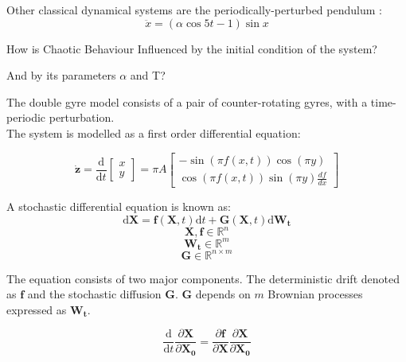 \documentclass{juliacon}
\newcommand{\drv}{\textrm{d}}
\begin{document}
Other classical dynamical systems are the periodically-perturbed pendulum :
\begin{equation}
\ddot{x}=(\alpha \cos5t -1 )\sin x
\end{equation}

How is Chaotic Behaviour Influenced by the initial condition of the system? 

And by its parameters $\alpha$ and T?

The double gyre model consists of a pair of counter-rotating gyres, with a time-periodic perturbation. \\ The system is modelled as a first order differential equation:

\begin{equation}
\dot{\mathbf{z}} =\frac{\drv}{\drv t}\begin{bmatrix}
    x \\
    y  \end{bmatrix}=\pi A\begin{bmatrix}
    -\sin(\pi f(x,t))\cos(\pi y) \\
    \cos(\pi f(x,t))\sin(\pi y)\frac{df}{dx}  \end{bmatrix} 
\end{equation}

A stochastic differential equation \cite{oksendal} is known as:
\begin{equation}
    \drv \mathbf{X}=\mathbf{f}(\mathbf{X},t) \drv t + \mathbf{G}(\mathbf{X},t) \drv \mathbf{W_t}
\end{equation}
\begin{equation*}
   \mathbf{X},\mathbf{f} \in \mathbb{R}^{n} 
\end{equation*}
\begin{equation*}
    \mathbf{W_t} \in \mathbb{R}^{m}
\end{equation*}
\begin{equation*}
    \mathbf{G} \in \mathbb{R}^{n \times m}
\end{equation*}

The equation consists of two major components. The deterministic drift denoted as $\mathbf{f}$ and the stochastic diffusion $\mathbf{G}$. $\mathbf{G}$ depends on $m$ Brownian processes expressed as $\mathbf{W_t}$.

\begin{equation}
    \frac{\drv}{\drv t} \frac{\partial \mathbf{X} }{\partial \mathbf{X_0}} = \frac{\partial \mathbf{f}}{\partial \mathbf{X}}\frac{\partial \mathbf{X}}{\partial \mathbf{X_0}}
\end{equation}
\end{document}
